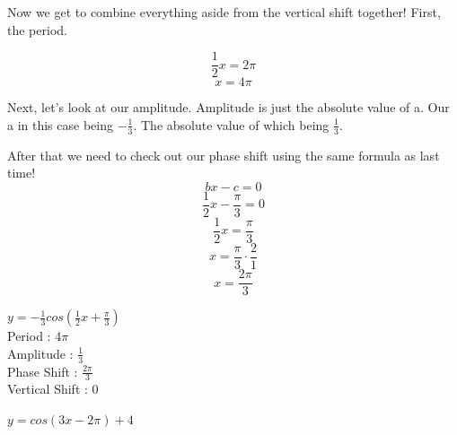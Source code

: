 \documentclass[10pt,letterpaper]{amspset}
\begin{document}
\begin{solution}[Solution]
    Now we get to combine everything aside from the vertical shift together! First, the period.
    
    \[ \frac{1}{2}x = 2\pi \]
    \[\boxed{ x = 4\pi }\]
    
    Next, let's look at our amplitude. Amplitude is just the absolute value of a. Our a in this case being $-\frac{1}{3}$. The absolute value of which being $\frac{1}{3}$.
    
    After that we need to check out our phase shift using the same formula as last time!
    \[ bx - c = 0 \]
    \[ \frac{1}{2}x - \frac{\pi}{3} = 0 \]
    \[ \frac{1}{2}x = \frac{\pi}{3} \]
    \[ x = \frac{\pi}{3} \cdot \frac{2}{1} \]
    \[\boxed{ x = \frac{2\pi}{3} }\]
    
    
    \noindent $y = -\frac{1}{3} cos (\frac{1}{2}x + \frac{\pi}{3})$ \\[+2mm]
    Period : $4\pi$ \\[+2mm]
    Amplitude : $\frac{1}{3}$ \\[+2mm]
    Phase Shift : $\frac{2\pi}{3}$ \\[+2mm]
    Vertical Shift : 0 \\
   
   
\end{solution}


\pagebreak


\begin{problem}[8]
    $y = cos (3x - 2\pi) + 4$
\end{problem}
\end{document}
